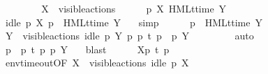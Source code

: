 \begin{isabellebody}
\isanewline
\ \ \isamarkupfalse%
\isanewline
\ \ \ \ \isamarkupfalse%
\ {\isacartoucheopen}X\ {\isasymsubseteq}\ visible{\isacharunderscore}{\kern0pt}actions{\isacartoucheclose}\isanewline
\ \ \ \ \isamarkupfalse%
\ {\isacartoucheopen}p\ {\isasymTTurnstile}{\isacharbrackleft}{\kern0pt}X{\isacharbrackright}{\kern0pt}\ HMLt{\isacharunderscore}{\kern0pt}time\ Y\ {\isasymphi}{\isacartoucheclose}\isanewline
\isanewline
\ \ \ \ \isamarkupfalse%
\ {\isacartoucheopen}idle\ p\ X{\isacartoucheclose}\ {\isacartoucheopen}p\ {\isasymTTurnstile}\ HMLt{\isacharunderscore}{\kern0pt}time\ Y\ {\isasymphi}{\isacartoucheclose}\ \isamarkupfalse%
\ simp{\isacharplus}{\kern0pt}\isanewline
\ \ \ \ \isamarkupfalse%
\ {\isacartoucheopen}p\ {\isasymTTurnstile}\ HMLt{\isacharunderscore}{\kern0pt}time\ Y\ {\isasymphi}{\isacartoucheclose}\ \isamarkupfalse%
\ {\isacartoucheopen}Y\ {\isasymsubseteq}\ visible{\isacharunderscore}{\kern0pt}actions{\isacartoucheclose}\ {\isacartoucheopen}idle\ p\ Y{\isacartoucheclose}\ {\isacartoucheopen}{\isasymexists}p{\isacharprime}{\kern0pt}{\isachardot}{\kern0pt}\ p\ {\isasymlongmapsto}t\ p{\isacharprime}{\kern0pt}\ {\isasymand}\ p{\isacharprime}{\kern0pt}\ {\isasymTTurnstile}{\isacharbrackleft}{\kern0pt}Y{\isacharbrackright}{\kern0pt}\ {\isasymphi}{\isacartoucheclose}\isanewline
\ \ \ \ \ \ \isamarkupfalse%
\ auto\isanewline
\ \ \ \ \isamarkupfalse%
\ \isamarkupfalse%
\ p{\isacharprime}{\kern0pt}\ \ {\isacartoucheopen}p\ {\isasymlongmapsto}t\ p{\isacharprime}{\kern0pt}{\isacartoucheclose}\ {\isacartoucheopen}p{\isacharprime}{\kern0pt}\ {\isasymTTurnstile}{\isacharbrackleft}{\kern0pt}Y{\isacharbrackright}{\kern0pt}\ {\isasymphi}{\isacartoucheclose}\ \isamarkupfalse%
\ blast\isanewline
\isanewline
\ \ \ \ \isamarkupfalse%
\ {\isacartoucheopen}{\isasymtheta}{\isacharbrackleft}{\kern0pt}X{\isacharbrackright}{\kern0pt}{\isacharparenleft}{\kern0pt}p{\isacharparenright}{\kern0pt}\ {\isasymlongmapsto}\isactrlsup {\isasymtheta}t{\isacharunderscore}{\kern0pt}{\isasymepsilon}\ {\isasymtheta}{\isacharparenleft}{\kern0pt}p{\isacharparenright}{\kern0pt}{\isacartoucheclose}\ \isamarkupfalse%
\ env{\isacharunderscore}{\kern0pt}timeout{\isacharbrackleft}{\kern0pt}OF\ {\isacartoucheopen}X\ {\isasymsubseteq}\ visible{\isacharunderscore}{\kern0pt}actions{\isacartoucheclose}\ {\isacartoucheopen}idle\ p\ X{\isacartoucheclose}{\isacharbrackright}{\kern0pt}\ \isacommand{{\isachardot}{\kern0pt}}\isamarkupfalse%

\end{isabellebody}
